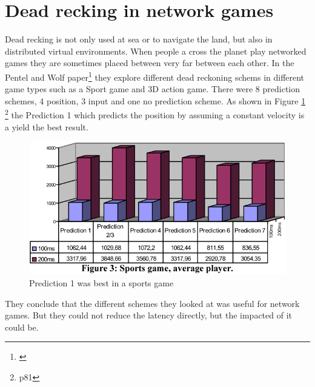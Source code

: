 \section{Dead recking in network games}
Dead recking is not only used at sea or to navigate the land, but also in distributed virtual environments. When people a cross the planet play networked games they are sometimes placed between very far between each other. In the Pentel and Wolf paper\footnote{\cite{Pantel2002}} they explore different dead reckoning schems in different game types such as a Sport game and 3D action game. There were 8 prediction schemes, 4 position, 3 input and one no prediction scheme. As shown in Figure \ref{fig:wolfpeperimage} \footnote{\cite{Pantel2002} p81} the Prediction 1 which predicts the position by assuming a constant velocity is a yield the best result.
\begin{figure}[H]
	\centering
	\includegraphics[width=0.5\linewidth]{positioning/positioning/wolfpeperImage}
	\caption{Prediction 1 was best in a sports game}
	\label{fig:wolfpeperimage}
\end{figure}
They conclude that the different schemes they looked at was useful for network games. But they could not reduce the latency directly, but the impacted of it could be.